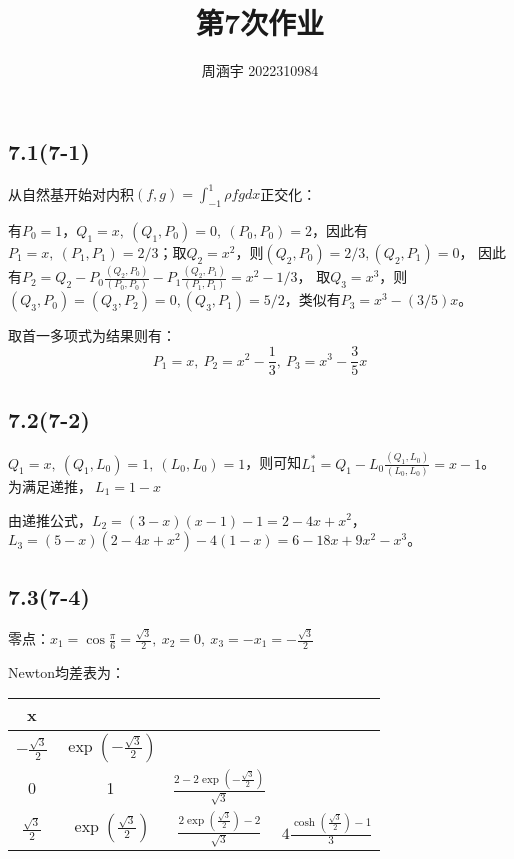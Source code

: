 \documentclass[UTF8,zihao=5]{ctexart}
\title{{\bfseries 第7次作业}}
\author{周涵宇 2022310984}
\date{}
\begin{document}
\maketitle

\subsection*{7.1(7-1)}

从自然基开始对内积$(f,g)=\int_{-1}^{1}{\rho fg dx}$正交化：

有$P_0=1$，$Q_1=x,\ (Q_1,P_0)=0,\ (P_0,P_0)=2$，因此有
$P_1=x,\ (P_1,P_1)=2/3$；取$Q_2=x^2$，则$(Q_2,P_0)=2/3, (Q_2,P_1)=0$，
因此有$P_2=Q_2-P_0\frac{(Q_2,P_0)}{(P_0,P_0)}-P_1\frac{(Q_2,P_1)}{(P_1,P_1)}=x^2-1/3$，
取$Q_3=x^3$，则$(Q_3,P_0)=(Q_3,P_2)=0, (Q_3,P_1)=5/2$，类似有$P_3=x^3-(3/5)x$。

取首一多项式为结果则有：
$$
    P_1=x,\ P_2=x^2-\frac{1}{3},\ P_3=x^3-\frac{3}{5}x
$$

\subsection*{7.2(7-2)}

$Q_1=x,\ (Q_1,L_0)=1,\ (L_0,L_0)=1$，则可知$L_1^*=Q_1-L_0\frac{(Q_1,L_0)}{(L_0,L_0)}=x-1$。
为满足递推，$\ L_1=1-x$

由递推公式，$L_2=(3-x)(x-1)-1=2-4x+x^2$，$L_3=(5-x)(2-4x+x^2)-4(1-x)=6-18x+9x^2-x^3$。

\subsection*{7.3(7-4)}

零点：$x_1=\cos{\frac{\pi}{6}}=\frac{\sqrt{3}}{2},\ x_2=0,\ x_3=-x_1=-\frac{\sqrt{3}}{2}$

Newton均差表为：
\begin{table}[H]
    \centering
    \begin{tabular}{c|ccc}
        x                                                                                                                                                \\
        \hline
        $-\frac{\sqrt{3}}{2}$ & $\exp(-\frac{\sqrt{3}}{2})$                                                                                              \\
        0                     & 1                           & $\frac{2-2\exp(-\frac{\sqrt{3}}{2})}{\sqrt{3}}$                                            \\
        $\frac{\sqrt{3}}{2}$  & $\exp(\frac{\sqrt{3}}{2})$  & $\frac{2\exp(\frac{\sqrt{3}}{2})-2}{\sqrt{3}}$  & $4\frac{\cosh(\frac{\sqrt{3}}{2})-1}{3}$ \\
    \end{tabular}
\end{table}
\end{document}
